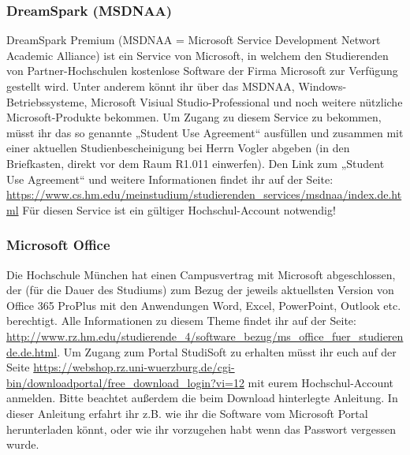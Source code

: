 \subsubsection{DreamSpark (MSDNAA)}
DreamSpark Premium (MSDNAA = Microsoft Service Development 
Networt Academic Alliance) ist ein Service von Microsoft, in welchem 
den Studierenden von Partner-Hochschulen kostenlose Software der 
Firma Microsoft zur Verfügung gestellt wird. \doublebreak
Unter anderem könnt ihr über das MSDNAA, Windows-Betriebssysteme, 
Microsoft Visiual Studio-Professional und noch weitere nützliche 
Microsoft-Produkte bekommen. \doublebreak
Um Zugang zu diesem Service zu bekommen, müsst ihr das so genannte 
„Student Use Agreement“ ausfüllen und zusammen mit einer aktuellen 
Studienbescheinigung bei Herrn Vogler abgeben (in den Briefkasten, 
direkt vor dem Raum R1.011 einwerfen). \doublebreak
Den Link zum „Student Use Agreement“ und weitere Informationen 
findet ihr auf der Seite: \doublebreak
\url{https://www.cs.hm.edu/meinstudium/studierenden_services/msdnaa/index.de.html}
Für diesen Service ist ein gültiger Hochschul-Account notwendig!

\subsubsection{Microsoft Office}
Die Hochschule München hat einen Campusvertrag mit Microsoft abgeschlossen, der (für die Dauer des Studiums) zum Bezug der jeweils aktuellsten Version von Office 365 ProPlus mit den Anwendungen Word, Excel, PowerPoint, Outlook etc. berechtigt. Alle Informationen zu diesem Theme findet ihr auf der Seite: \url{http://www.rz.hm.edu/studierende_4/software_bezug/ms_office_fuer_studierende.de.html}.\doublebreak
Um Zugang zum Portal StudiSoft zu erhalten müsst ihr euch auf der Seite \url{https://webshop.rz.uni-wuerzburg.de/cgi-bin/downloadportal/free_download_login?vi=12} mit eurem Hochschul-Account anmelden. Bitte beachtet außerdem die beim Download hinterlegte Anleitung. In dieser Anleitung erfahrt ihr z.B. wie ihr die Software vom Microsoft Portal herunterladen könnt, oder wie ihr vorzugehen habt wenn das Passwort vergessen wurde.